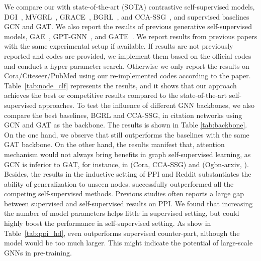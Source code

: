 { 
We compare our \model with state-of-the-art (SOTA) contrastive self-supervised models, DGI~\cite{velivckovic2018deep}, MVGRL~\cite{hassani2020contrastive}, GRACE~\cite{zhu2020deep}, BGRL~\cite{thakoor2021bootstrapped}, and CCA-SSG~\cite{zhang2021canonical}, and supervised baselines GCN and GAT. We also report the results of previous generative self-supervised models, GAE~\cite{kipf2016variational}, GPT-GNN~\cite{hu2020gpt}, and GATE~\cite{amin2020gate}.
We report results from previous papers with the same experimental setup if available. If results are not previously reported and codes are provided, we implement them based on the official codes and conduct a hyper-parameter search. Otherwise we only report the results on Cora/Citeseer/PubMed using our re-implemented codes according to the paper. Table~\ref{tab:node_clf} represents the results, and it shows that our approach achieves the best or competitive results compared to the state-of-the-art self-supervised approaches. To test the influence of different GNN backbones, we also compare the best baselines, BGRL and CCA-SSG, in citation networks using GCN and GAT as the backbone. The results is shown in Table \ref{tab:backbone}. On the one hand, we observe that \model still outperforms the baselines with the same GAT backbone. 
On the other hand, the results manifest that, attention mechanism would not always bring benefits in graph self-supervised learning, as GCN is inferior to GAT, for instance, in (Cora, CCA-SSG) and (Ogbn-arxiv, \model).
Besides, the results in the inductive setting of PPI and Reddit substantiates the ability of generalization to unseen nodes. \model successfully outperformed all the competing self-supervised methods.  
Previous studies often reports a large gap between supervised and self-supervised results on PPI. We found that increasing the number of model parameters helps little in supervised setting, but could highly boost the performance in self-supervised setting. As show in Table~\ref{tab:ppi_hd}, \model even outperforms supervised counter-part, although the model would be too much larger. This might indicate the potential of large-scale GNNs in pre-training.




}
